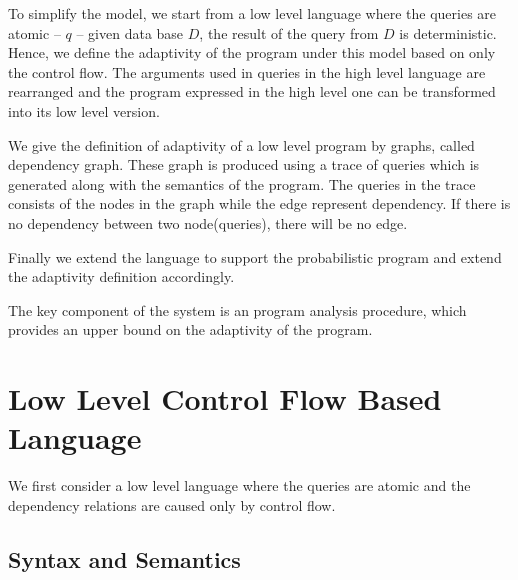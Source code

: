 \documentclass[a4paper,11pt]{article}
\begin{document}
To simplify the model, we start from a low level language where the
queries are atomic -- $q$ -- given data base $D$, the result of the
query from $D$ is deterministic. Hence, we define the adaptivity of
the program under this model based on only the control flow. The
arguments used in queries in the high level language are rearranged
and the program expressed in the high level one can be
transformed into its low level version.

We give the definition of adaptivity of a low level program by
graphs, called dependency graph. These graph is produced 
using a
trace of queries which is generated along with the semantics of the
program. The queries in the trace consists of the nodes in the graph
while the edge represent dependency. If there is no dependency between
two node(queries), there will be no edge.

Finally we extend the language to support the probabilistic program and extend the adaptivity definition accordingly.


The key component of the system is an program analysis procedure, which provides an upper bound on the adaptivity of the program.

\section{Low Level Control Flow Based Language}
We first consider a low level language where the queries are atomic
and the dependency relations are caused only by control flow.
%
\subsection{Syntax and Semantics}
%
\end{document}
